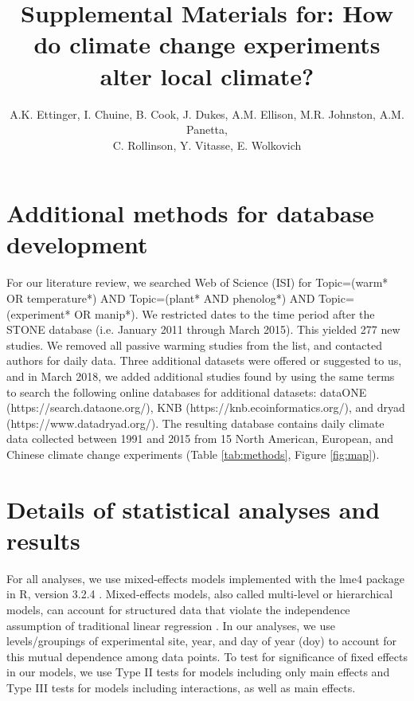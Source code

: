 \documentclass{article}
\begin{document}

\title{Supplemental Materials for: How do climate change experiments alter local climate?} %

\author{A.K. Ettinger, I. Chuine, B. Cook, J. Dukes, A.M. Ellison, M.R. Johnston, A.M. Panetta,\\ C. Rollinson, Y. Vitasse, E. Wolkovich}
\maketitle  %
\renewcommand{\thetable}{S\arabic{table}}
\renewcommand{\thefigure}{S\arabic{figure}}

\section* {Additional methods for database development}
For our literature review, we searched Web of Science (ISI) for Topic=(warm* OR temperature*) AND Topic=(plant* AND phenolog*) AND Topic=(experiment* OR manip*). We restricted dates to the time period after the STONE database (i.e. January 2011 through March 2015). This yielded 277 new studies. We removed all passive warming studies from the list, and contacted authors for daily data. Three additional datasets were offered or suggested to us, and in March 2018, we added additional studies found by using the same terms to search the following online databases for additional datasets: dataONE (https://search.dataone.org/), KNB (https://knb.ecoinformatics.org/), and dryad (https://www.datadryad.org/). The resulting database contains daily climate data collected between 1991 and 2015 from 15 North American, European, and Chinese climate change experiments (Table \ref{tab:methods}, Figure \ref{fig:map}). %

\section* {Details of statistical analyses and results}
For all analyses, we use mixed-effects models implemented with the lme4 package in R, version 3.2.4 \citep{bates2015,rcoreteam2017}. Mixed-effects models, also called multi-level or hierarchical models, can account for structured data that violate the independence assumption of traditional linear regression \citep{gelman2007}. In our analyses, we use levels/groupings of experimental site, year, and day of year (doy) to account for this mutual dependence among data points. To test for significance of fixed effects in our models, we use Type II tests for models including only main effects and Type III tests for models including interactions, as well as main effects. 
\end{document}
